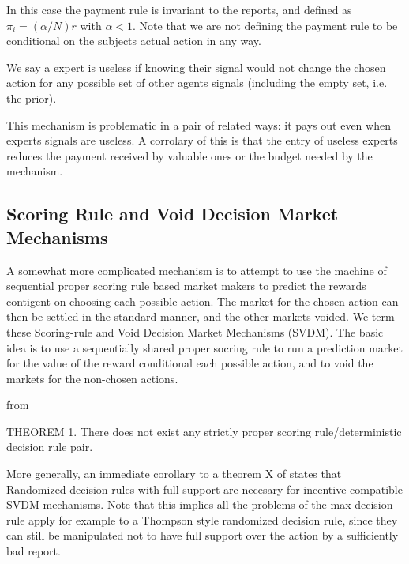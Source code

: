 In this case the payment rule is invariant to the reports, and defined as $\pi_i  = (\alpha / N ) r $ with $\alpha < 1$. Note that we are not defining the payment rule to be conditional on the subjects actual action in any way. %

We say a expert is useless if knowing their signal would not change the chosen action for any possible set of other agents signals (including the empty set, i.e. the prior).

This mechanism is problematic in a pair of related ways: it pays out even when experts signals are useless.
A corrolary of this is that the entry of useless experts reduces the payment received by valuable ones or the budget needed by the mechanism.



\subsection{Scoring Rule and Void Decision Market Mechanisms}

A somewhat more complicated mechanism is to attempt to use the machine of sequential proper scoring rule based market makers to predict the rewards contigent on choosing each possible action. The market for the chosen action can then be settled in the standard manner, and the other markets voided. 
We term these Scoring-rule and Void Decision Market Mechanisms (SVDM). The basic idea is to use a sequentially shared proper socring rule to run a prediction market for the value of the reward conditional each possible action, and to void the markets for the non-chosen actions.  

	from \cite{othman2010decision}


THEOREM 1. There does not exist any strictly proper scoring rule/deterministic decision rule pair.

More generally, an immediate corollary to a theorem X of \cite{chen2014eliciting} states that Randomized decision rules with full support are necesary for incentive compatible SVDM mechanisms.
Note that this implies all the problems of the max decision rule apply for example to a Thompson style randomized decision rule, since they can still be manipulated not to have full support over the action by a sufficiently bad report.

